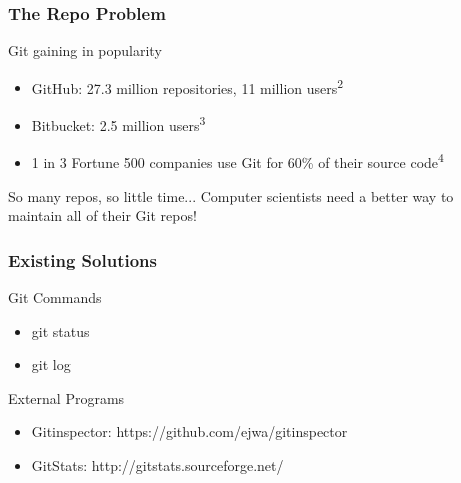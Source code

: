 \documentclass{beamer}
\begin{document}
\begin{frame}

    \centering
    \frametitle{The Repo Problem}

	\begin{block}{Git gaining in popularity}
		\begin{itemize}
			\item GitHub: 27.3 million repositories, 11 million users\textsuperscript{2}
			\item Bitbucket: 2.5 million users\textsuperscript{3}
			\item 1 in 3 Fortune 500 companies use Git for 60\% of their source code\textsuperscript{4}
		\end{itemize}
	\end{block}    
	
	\pause 
	
    \begin{block}{So many repos, so little time...}
    		Computer scientists need a better way to maintain all of their Git repos!      
    \end{block}
    
    	
\end{frame}

\begin{frame}
	\centering
	\frametitle{Existing Solutions}
	
	\begin{block}{Git Commands}
		\begin{itemize}
			\item git status
			\item git log
		\end{itemize}
	\end{block}
	
	\pause
	
	\begin{block}{External Programs}
		\begin{itemize}
			\item Gitinspector: https://github.com/ejwa/gitinspector
			\item GitStats: http://gitstats.sourceforge.net/
		\end{itemize}
	\end{block}
	
	\

\end{frame}
\end{document}
